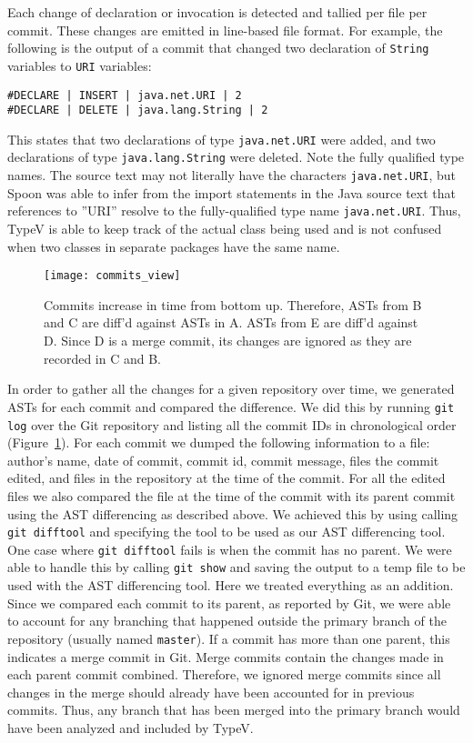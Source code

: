 Each change of declaration or invocation is detected and tallied per file per commit. These changes are emitted in line-based file format. For example, the following is the output of a commit that changed two declaration of \texttt{String} variables to \texttt{URI} variables:

\begin{verbatim}
#DECLARE | INSERT | java.net.URI | 2
#DECLARE | DELETE | java.lang.String | 2
\end{verbatim}

This states that two declarations of type \texttt{java.net.URI} were added, and two declarations of type \texttt{java.lang.String} were deleted. Note the fully qualified type names. The source text may not literally have the characters \texttt{java.net.URI}, but Spoon was able to infer from the import statements in the Java source text that references to ''URI'' resolve to the fully-qualified type name \texttt{java.net.URI}. Thus, TypeV is able to keep track of the actual class being used and is not confused when two classes in separate packages have the same name.

\begin{figure}[h]
\centering
\texttt{[image: commits\_view]}
\caption{Commits increase in time from bottom up. Therefore, ASTs from B and C are diff'd against ASTs in A. ASTs from E are diff'd against D. Since D is a merge commit, its changes are ignored as they are recorded in C and B.}
\label{fig:commits}
\end{figure}

In order to gather all the changes for a given repository over time, we generated ASTs for each commit and compared the difference. We did this by running \texttt{git log} over the Git repository and listing all the commit IDs in chronological order (Figure~\ref{fig:commits}). For each commit we dumped the following information to a file: author's name, date of commit, commit id, commit message, files the commit edited, and files in the repository at the time of the commit. For all the edited files we also compared the file at the time of the commit with its parent commit using the AST differencing as described above. We achieved this by using calling \texttt{git difftool} and specifying the tool to be used as our AST differencing tool. One case where \texttt{git difftool} fails is when the commit has no parent. We were able to handle this by calling \texttt{git show} and saving the output to a temp file to be used with the AST differencing tool. Here we treated everything as an addition. Since we compared each commit to its parent, as reported by Git, we were able to account for any branching that happened outside the primary branch of the repository (usually named \texttt{master}). If a commit has more than one parent, this indicates a merge commit in Git. Merge commits contain the changes made in each parent commit combined. Therefore, we ignored merge commits since all changes in the merge should already have been accounted for in previous commits. Thus, any branch that has been merged into the primary branch would have been analyzed and included by TypeV.

